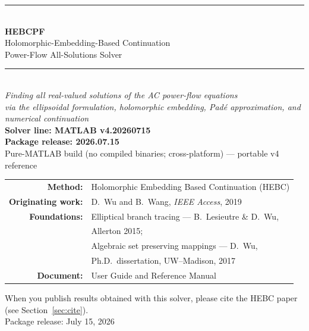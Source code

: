\documentclass[11pt,a4paper]{article}
\begin{document}
\begin{titlepage}
\centering
\vspace*{2.2cm}
{\color{rule}\rule{\textwidth}{1.2pt}}\\[8pt]
{\Huge\bfseries HEBCPF}\\[10pt]
{\LARGE Holomorphic-Embedding-Based Continuation}\\[4pt]
{\LARGE Power-Flow All-Solutions Solver}\\[10pt]
{\color{rule}\rule{\textwidth}{1.2pt}}\\[18pt]
{\large\itshape Finding \emph{all} real-valued solutions of the AC power-flow equations}\\[6pt]
{\large\itshape via the ellipsoidal formulation, holomorphic embedding, Pad\'e approximation, and numerical continuation}\\[26pt]

{\large\bfseries Solver line: MATLAB v4.20260715}\\[2pt]
{\large\bfseries Package release: 2026.07.15}\\[4pt]
{\large Pure-MATLAB build (no compiled binaries; cross-platform) --- portable v4 reference}\\[12pt]

\begin{tabular}{rl}
\textbf{Method:} & Holomorphic Embedding Based Continuation (HEBC)\\[3pt]
\textbf{Originating work:} & D.\ Wu and B.\ Wang, \emph{IEEE Access}, 2019\\[6pt]
\textbf{Foundations:} & Elliptical branch tracing --- B.\ Lesieutre \& D.\ Wu,\\[1pt]
                      & Allerton 2015;\\[3pt]
                      & Algebraic set preserving mappings --- D.\ Wu,\\[1pt]
                      & Ph.D.\ dissertation, UW--Madison, 2017\\[6pt]
\textbf{Document:} & User Guide and Reference Manual\\
\end{tabular}

\vfill
{\small When you publish results obtained with this solver, please cite the HEBC
paper (see Section~\ref{sec:cite}).}\\[6pt]
{\small Package release: July 15, 2026}
\end{titlepage}

\tableofcontents
\newpage
\end{document}
